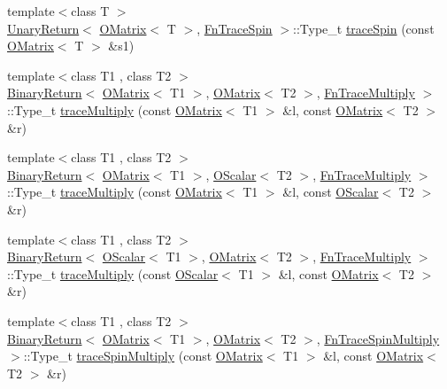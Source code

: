 \begin{DoxyCompactItemize}
\item 
{\footnotesize template$<$class T $>$ }\\\mbox{\hyperlink{structENSEM_1_1UnaryReturn}{Unary\+Return}}$<$ \mbox{\hyperlink{classENSEM_1_1OMatrix}{O\+Matrix}}$<$ T $>$, \mbox{\hyperlink{structENSEM_1_1FnTraceSpin}{Fn\+Trace\+Spin}} $>$\+::Type\+\_\+t \mbox{\hyperlink{group__obsmatrix_gae311225b718ade4433fe82a01a290d63}{trace\+Spin}} (const \mbox{\hyperlink{classENSEM_1_1OMatrix}{O\+Matrix}}$<$ T $>$ \&s1)
\item 
{\footnotesize template$<$class T1 , class T2 $>$ }\\\mbox{\hyperlink{structENSEM_1_1BinaryReturn}{Binary\+Return}}$<$ \mbox{\hyperlink{classENSEM_1_1OMatrix}{O\+Matrix}}$<$ T1 $>$, \mbox{\hyperlink{classENSEM_1_1OMatrix}{O\+Matrix}}$<$ T2 $>$, \mbox{\hyperlink{structENSEM_1_1FnTraceMultiply}{Fn\+Trace\+Multiply}} $>$\+::Type\+\_\+t \mbox{\hyperlink{group__obsmatrix_ga60f2f16fd8f3e889214584d3c0a90e92}{trace\+Multiply}} (const \mbox{\hyperlink{classENSEM_1_1OMatrix}{O\+Matrix}}$<$ T1 $>$ \&l, const \mbox{\hyperlink{classENSEM_1_1OMatrix}{O\+Matrix}}$<$ T2 $>$ \&r)
\item 
{\footnotesize template$<$class T1 , class T2 $>$ }\\\mbox{\hyperlink{structENSEM_1_1BinaryReturn}{Binary\+Return}}$<$ \mbox{\hyperlink{classENSEM_1_1OMatrix}{O\+Matrix}}$<$ T1 $>$, \mbox{\hyperlink{classENSEM_1_1OScalar}{O\+Scalar}}$<$ T2 $>$, \mbox{\hyperlink{structENSEM_1_1FnTraceMultiply}{Fn\+Trace\+Multiply}} $>$\+::Type\+\_\+t \mbox{\hyperlink{group__obsmatrix_ga465cbe792dfb205b829f653853253e8f}{trace\+Multiply}} (const \mbox{\hyperlink{classENSEM_1_1OMatrix}{O\+Matrix}}$<$ T1 $>$ \&l, const \mbox{\hyperlink{classENSEM_1_1OScalar}{O\+Scalar}}$<$ T2 $>$ \&r)
\item 
{\footnotesize template$<$class T1 , class T2 $>$ }\\\mbox{\hyperlink{structENSEM_1_1BinaryReturn}{Binary\+Return}}$<$ \mbox{\hyperlink{classENSEM_1_1OScalar}{O\+Scalar}}$<$ T1 $>$, \mbox{\hyperlink{classENSEM_1_1OMatrix}{O\+Matrix}}$<$ T2 $>$, \mbox{\hyperlink{structENSEM_1_1FnTraceMultiply}{Fn\+Trace\+Multiply}} $>$\+::Type\+\_\+t \mbox{\hyperlink{group__obsmatrix_gab9e4e0bccae4aa80554908fd966782e1}{trace\+Multiply}} (const \mbox{\hyperlink{classENSEM_1_1OScalar}{O\+Scalar}}$<$ T1 $>$ \&l, const \mbox{\hyperlink{classENSEM_1_1OMatrix}{O\+Matrix}}$<$ T2 $>$ \&r)
\item 
{\footnotesize template$<$class T1 , class T2 $>$ }\\\mbox{\hyperlink{structENSEM_1_1BinaryReturn}{Binary\+Return}}$<$ \mbox{\hyperlink{classENSEM_1_1OMatrix}{O\+Matrix}}$<$ T1 $>$, \mbox{\hyperlink{classENSEM_1_1OMatrix}{O\+Matrix}}$<$ T2 $>$, \mbox{\hyperlink{structENSEM_1_1FnTraceSpinMultiply}{Fn\+Trace\+Spin\+Multiply}} $>$\+::Type\+\_\+t \mbox{\hyperlink{group__obsmatrix_gabff96ae04e02659ddc78f25a8d61bf61}{trace\+Spin\+Multiply}} (const \mbox{\hyperlink{classENSEM_1_1OMatrix}{O\+Matrix}}$<$ T1 $>$ \&l, const \mbox{\hyperlink{classENSEM_1_1OMatrix}{O\+Matrix}}$<$ T2 $>$ \&r)

\end{DoxyCompactItemize}
